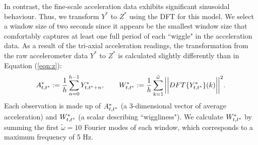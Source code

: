 In contrast, the fine-scale acceleration data exhibits significant sinusoidal behaviour. Thus, we transform $Y^*$ to $Z^*$ using the DFT for this model. We select a window size of two seconds since it appears be the smallest window size that comfortably captures at least one full period of each ``wiggle" in the acceleration data. As a result of the tri-axial acceleration readings, the transformation from the raw accelerometer data $Y^*$ to $Z^*$ is calculated slightly differently than in Equation (\ref{eqn:z}):
%
\begin{equation}
    \label{eqn:z0}
    \Zone_{t,t^*} := \frac{1}{h}\sum_{n=0}^{h-1}Y^*_{t,t^*+n}, \qquad \Ztwo_{t,t^*} := \frac{1}{h}\sum_{k=1}^{\tilde{\omega}}\bigg|\bigg|DFT\{Y^*_{t,t^*}\}(k)\bigg|\bigg|^2.
\end{equation}
%
Each observation is made up of $A^*_{t,t^*}$ (a 3-dimensional vector of average acceleration) and $W^*_{t,t^*}$ (a scalar describing ``wiggliness"). We calculate $W^*_{t,t^*}$ by summing the first $\tilde \omega = 10$ Fourier modes of each window, which corresponds to a maximum frequency of 5 Hz. 

